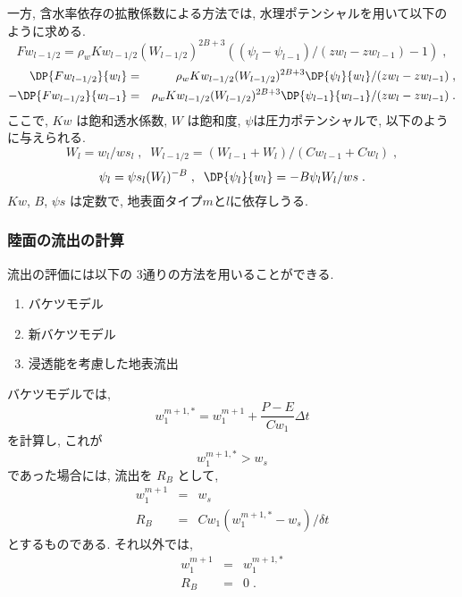 一方, 含水率依存の拡散係数による方法では, 
水理ポテンシャルを用いて以下のように求める.
\begin{equation}
  Fw_{l-1/2} = \rho_w Kw_{l-1/2} (W_{l-1/2})^{2B+3} 
             ( (\psi_{l} - \psi_{l-1})/(zw_{l} - zw_{l-1}) -1 ) \; ,
\end{equation}
\begin{eqnarray}
  \DP{Fw_{l-1/2}}{w_l} &=& \rho_w Kw_{l-1/2} (W_{l-1/2})^{2B+3} 
                     \DP{\psi_{l}}{w_l}/(zw_l - zw_{l-1}) \; ,\\
- \DP{Fw_{l-1/2}}{w_{l-1}} &=& \rho_w Kw_{l-1/2} (W_{l-1/2})^{2B+3} 
                     \DP{\psi_{l-1}}{w_{l-1}}/(zw_l - zw_{l-1}) \; .
\end{eqnarray}
ここで, $Kw$ は飽和透水係数, $W$ は飽和度, $\psi$は圧力ポテンシャルで, 
以下のように与えられる. 
\begin{equation}
  W_l = w_l / ws_l \; , \;\;
  W_{l-1/2} = (W_{l-1} + W_{l})/(Cw_{l-1} + Cw_{l}) \; ,
\end{equation}
\begin{equation}
  \psi_l = \psi s_l (W_l)^{-B}\; , \;\;
  \DP{\psi_l}{w_l} = -B \psi_l W_l / ws \; .
\end{equation}
$Kw$, $B$, $\psi s$ は定数で, 地表面タイプ$m$と$l$に依存しうる. 

\subsubsection{陸面の流出の計算}

流出の評価には以下の 3通りの方法を用いることができる. 
\begin{enumerate}
\item バケツモデル
\item 新バケツモデル
\item 浸透能を考慮した地表流出
\end{enumerate}

バケツモデルでは,
\begin{equation}
w_1^{m+1,*} = w_1^{m+1} +  \frac{P - E}{Cw_1} \Delta t
\end{equation}
を計算し, これが
\begin{equation} 
 w_1^{m+1,*} > w_s 
\end{equation}
であった場合には, 流出を $R_B$ として,
\begin{eqnarray}
  w_1^{m+1} & = & w_s \\
  R_B  & = &  Cw_1 ( w_1^{m+1,*} - w_s )/\delta t
\end{eqnarray}
とするものである.
それ以外では, 
\begin{eqnarray}
  w_1^{m+1} & = &  w_1^{m+1,*} \\
  R_B       & = &  0                  \; .
\end{eqnarray}


